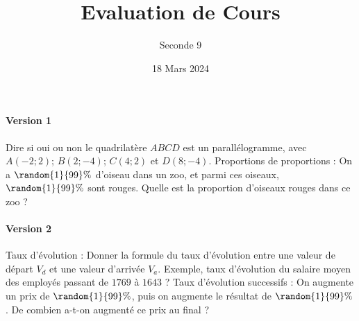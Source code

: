 \documentclass{exam}
\title{Evaluation de Cours}
\date{18 Mars 2024}
\author{Seconde 9}
\begin{document}
\maketitle
\thispagestyle{empty}
\paragraph{Version 1}
\begin{questions}
\question Dire si oui ou non le quadrilatère $ABCD$ est un parallélogramme, avec $A(-2;2)$; $B(2;-4)$; $C(4;2)$ et $D(8;-4)$.
\question Proportions de proportions : On a $\random{1}{99}\%$ d'oiseau dans un zoo, et parmi ces oiseaux, $\random{1}{99}\%$ sont rouges. Quelle est la proportion d'oiseaux rouges dans ce zoo ?
\end{questions}
\newpage
\maketitle
\thispagestyle{empty}
\paragraph{Version 2}
\begin{questions}
\question Taux d'évolution : Donner la formule du taux d'évolution entre une valeur de départ $V_d$ et une valeur d'arrivée $V_a$. Exemple, taux d'évolution du salaire moyen des employés passant de $1769$ à $1643$ ?
\question Taux d'évolution successifs : On augmente un prix de $\random{1}{99}\%$, puis on augmente le résultat de $\random{1}{99}\%$. De combien a-t-on augmenté ce prix au final ?
\end{questions}
\end{document}

